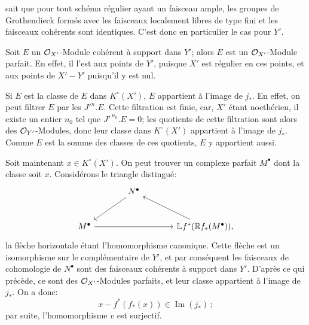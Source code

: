 sait que pour tout schéma régulier ayant un faisceau ample, les groupes de Grothendieck formés avec les faisceaux localement libres de type fini et les faisceaux cohérents sont identiques. C'est donc en particulier le cas pour \(Y'\).

Soit \(E\) un \(\cO_{X'}\)-Module cohérent à support dans \(Y'\); alors \(E\) est un \(\cO_{X'}\)-Module parfait. En effet, il l'est aux points de \(Y'\), puisque \(X'\) est régulier en ces points, et aux points de \(X'-Y'\) puisqu'il y est nul.

Si \(E\) est la classe de \(E\) dans \(K^\circ(X')\), \(E\) appartient à l'image de \(j_*\). En effet, on peut filtrer \(E\) par les \(J'^n.E\). Cette filtration est finie, car, \(X'\) étant noethérien, il existe un entier \(n_0\) tel que \(J'^{\,n_0}.E=0\); les quotients de cette filtration sont alors des \(\cO_{Y'}\)-Modules, donc leur classe dans \(K^\circ(X')\) appartient à l'image de \(j_*\). Comme \(E\) est la somme des classes de ces quotients, \(E\) y appartient aussi.

Soit maintenant \(x\in K^\circ(X')\). On peut trouver un complexe parfait \(M^\bullet\) dont la classe soit \(x\). Considérons le triangle distingué:
\[
\begin{tikzcd}[column sep=large,row sep=large]
& N^\bullet \arrow[dl] &\\
M^\bullet \arrow[rr] && \mathbb Lf^*(\mathbb Rf_*(M^\bullet)) \arrow[ul] ,
\end{tikzcd}
\]
la flèche horizontale étant l'homomorphisme canonique. Cette flèche est un isomorphisme sur le complémentaire de \(Y'\), et par conséquent les faisceaux de cohomologie de \(N^\bullet\) sont des faisceaux cohérents à support dans \(Y'\). D'après ce qui précède, ce sont des \(\cO_{X'}\)-Modules parfaits, et leur classe appartient à l'image de \(j_*\). On a donc:
\[
x-f^*(f_*(x))\in\operatorname{Im}(j_*)\,;
\]
par suite, l'homomorphisme \(v\) est surjectif.



\providecommand{\Q}{\mathbb Q}
\providecommand{\bfP}{\mathbf P}
\providecommand{\gr}{\operatorname{gr}}
\providecommand{\Id}{\operatorname{Id}}
\providecommand{\Fil}{\operatorname{Fil}}
\providecommand{\Imf}{\operatorname{Im}}
\providecommand{\rank}{\operatorname{rank}}
\providecommand{\codim}{\operatorname{codim}}
\providecommand{\cJ}{\mathcal J}
\providecommand{\cI}{\mathcal I}
\providecommand{\cN}{\mathcal N}
\providecommand{\cE}{\mathcal E}
\providecommand{\cO}{\mathcal O}


